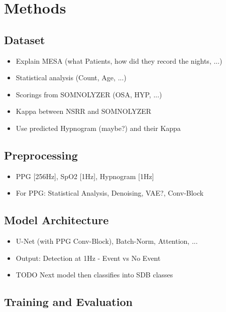 \chapter{Methods \label{Chapter-Methods}}

\section{Dataset}

\begin{itemize}
    \item Explain MESA (what Patients, how did they record the nights, ...)
    \item Statistical analysis (Count, Age, ...)
    \item Scorings from SOMNOLYZER (OSA, HYP, ...)
    \item Kappa between NSRR and SOMNOLYZER
    \item Use predicted Hypnogram (maybe?) and their Kappa
\end{itemize}

\section{Preprocessing}

\begin{itemize}
    \item PPG [256Hz], SpO2 [1Hz], Hypnogram [1Hz]
    \item For PPG: Statistical Analysis, Denoising, VAE?, Conv-Block
\end{itemize}

\section{Model Architecture}

\begin{itemize}
    \item U-Net (with PPG Conv-Block), Batch-Norm, Attention, ...
    \item Output: Detection at 1Hz - Event vs No Event
    \item TODO Next model then classifies into SDB classes
\end{itemize}

\section{Training and Evaluation}

